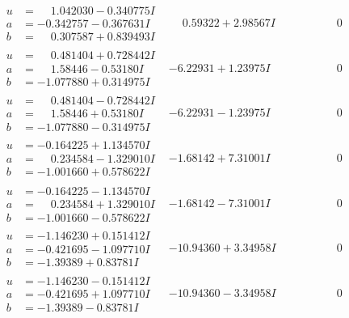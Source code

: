 \documentclass[1p]{elsarticle_modified}
\theoremstyle{definition}
\begin{document}
$$\begin{array}{c|c|c}
\begin{aligned}
u &= \phantom{-}1.042030 - 0.340775 I \\
a &= -0.342757 - 0.367631 I \\
b &= \phantom{-}0.307587 + 0.839493 I\end{aligned}
 & \phantom{-}0.59322 + 2.98567 I & \phantom{-0.000000 } 0 \\ \hline\begin{aligned}
u &= \phantom{-}0.481404 + 0.728442 I \\
a &= \phantom{-}1.58446 - 0.53180 I \\
b &= -1.077880 + 0.314975 I\end{aligned}
 & -6.22931 + 1.23975 I & \phantom{-0.000000 } 0 \\ \hline\begin{aligned}
u &= \phantom{-}0.481404 - 0.728442 I \\
a &= \phantom{-}1.58446 + 0.53180 I \\
b &= -1.077880 - 0.314975 I\end{aligned}
 & -6.22931 - 1.23975 I & \phantom{-0.000000 } 0 \\ \hline\begin{aligned}
u &= -0.164225 + 1.134570 I \\
a &= \phantom{-}0.234584 - 1.329010 I \\
b &= -1.001660 + 0.578622 I\end{aligned}
 & -1.68142 + 7.31001 I & \phantom{-0.000000 } 0 \\ \hline\begin{aligned}
u &= -0.164225 - 1.134570 I \\
a &= \phantom{-}0.234584 + 1.329010 I \\
b &= -1.001660 - 0.578622 I\end{aligned}
 & -1.68142 - 7.31001 I & \phantom{-0.000000 } 0 \\ \hline\begin{aligned}
u &= -1.146230 + 0.151412 I \\
a &= -0.421695 - 1.097710 I \\
b &= -1.39389 + 0.83781 I\end{aligned}
 & -10.94360 + 3.34958 I & \phantom{-0.000000 } 0 \\ \hline\begin{aligned}
u &= -1.146230 - 0.151412 I \\
a &= -0.421695 + 1.097710 I \\
b &= -1.39389 - 0.83781 I\end{aligned}
 & -10.94360 - 3.34958 I & \phantom{-0.000000 } 0 \\ \hline\begin{aligned}

\end{aligned}
\end{array}$$
\end{document}
